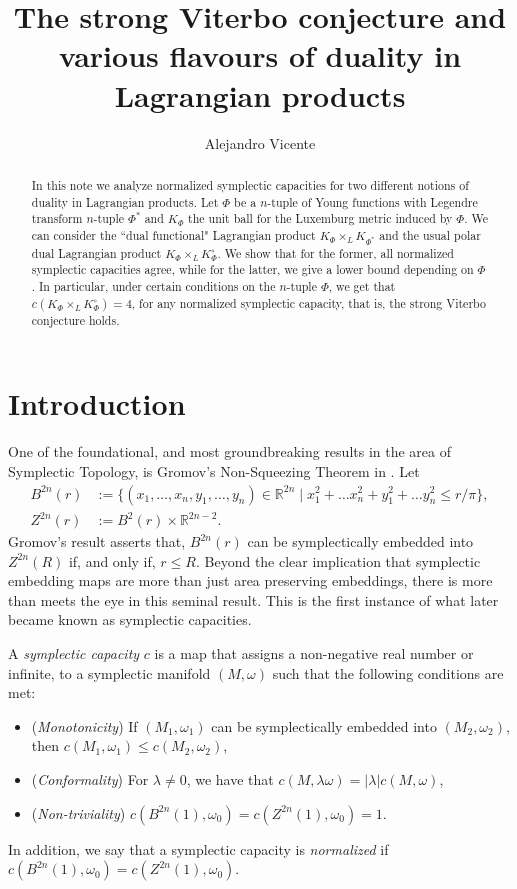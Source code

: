 \documentclass{article}
\title{The strong Viterbo conjecture and various flavours of duality in Lagrangian products}
\author{Alejandro Vicente}
\date{}
\theoremstyle{definition}
\begin{document}
\maketitle

\begin{abstract}
In this note we analyze normalized symplectic capacities for two different notions of duality in Lagrangian products. Let $\Phi$ be a $n$-tuple of Young functions with Legendre transform $n$-tuple $\Phi^*$ and $K_{\Phi}$ the unit ball for the Luxemburg metric induced by $\Phi$. We can consider the ``dual functional" Lagrangian product $K_{\Phi}\times_LK_{\Phi^*}$ and the usual polar dual Lagrangian product $K_{\Phi}\times_L K_{\Phi}^{\circ}$. We show that for the former, all normalized symplectic capacities agree, while for the latter, we give a lower bound depending on $\Phi$. In particular, under certain conditions on the $n$-tuple $\Phi$, we get that $c(K_{\Phi}\times_L K_{\Phi}^{\circ})=4$, for any normalized symplectic capacity, that is, the strong Viterbo conjecture holds.
\end{abstract}


\section{Introduction}

One of the foundational, and most groundbreaking results in the area of Symplectic Topology, is Gromov's Non-Squeezing Theorem in \cite{Gromov1985PseudoHC}. Let 
\begin{equation*}
    \begin{split}
        B^{2n}(r)&:=\{(x_1,\ldots,x_n,y_1,\ldots,y_n)\in \mathbb{R}^{2n}\mid x_1^2+\ldots x_n^2+y_1^2+\ldots y_n^2\leq r/\pi\},\\
        Z^{2n}(r)&:=B^2(r)\times \mathbb{R}^{2n-2}.
    \end{split}
    \end{equation*}
Gromov's result asserts that, $B^{2n}(r)$ can be symplectically embedded into $Z^{2n}(R)$ if, and only if, $r\leq R$. Beyond the clear implication that symplectic embedding maps are more than just area preserving embeddings, there is more than meets the eye in this seminal result. This is the first instance of what later became known as symplectic capacities.

    
A \textit{symplectic capacity} $c$ is a map that assigns a non-negative real number or infinite, to a symplectic manifold $(M,\omega)$ such that the following conditions are met:
\begin{itemize}
\item (\textit{Monotonicity}) If $(M_1,\omega_1)$ can be symplectically embedded into $(M_2,\omega_2)$, then $c(M_1,\omega_1)\leq c(M_2,\omega_2)$,
\item (\textit{Conformality}) For $\lambda\neq 0$, we have that $c(M,\lambda \omega)=|\lambda|c(M,\omega)$,
\item (\textit{Non-triviality}) $c(B^{2n}(1),\omega_0)=c(Z^{2n}(1),\omega_0)=1$.
\end{itemize}
In addition, we say that a symplectic capacity is \textit{normalized} if $c(B^{2n}(1),\omega_0)=c(Z^{2n}(1),\omega_0)$.
\end{document}
